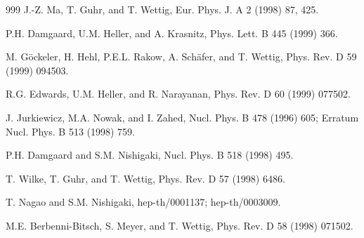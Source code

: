 \begin{thebibliography}{999}
                      J.-Z. Ma, T. Guhr, and T. Wettig, 
                      Eur. Phys. J. A 2 (1998) 87, 425.        %

                      P.H. Damgaard, U.M. Heller, and A. Krasnitz,
                      Phys. Lett. B 445 (1999) 366.          %

                      M. G\"ockeler, H. Hehl, P.E.L. Rakow,
                      A. Sch\"afer, and T. Wettig,
                      Phys. Rev. D 59 (1999) 094503.          %

     R.G. Edwards, U.M. Heller, and R. Narayanan,
                      Phys. Rev. D 60 (1999) 077502.               %

      J. Jurkiewicz, M.A. Nowak, and I. Zahed,
                      Nucl. Phys. B 478 (1996) 605;             %
                      Erratum Nucl. Phys. B 513 (1998) 759.     %

      P.H. Damgaard and S.M. Nishigaki, 
                      Nucl. Phys. B 518 (1998) 495.           %

      T. Wilke, T. Guhr, and T. Wettig, 
                      Phys. Rev. D 57 (1998) 6486.            %

      T. Nagao and S.M. Nishigaki,
                      hep-th/0001137;                               %
                      hep-th/0003009.                               %

                      M.E. Berbenni-Bitsch, S. Meyer, and T. Wettig,
                      Phys. Rev. D 58 (1998) 071502.          %


\end{thebibliography}
